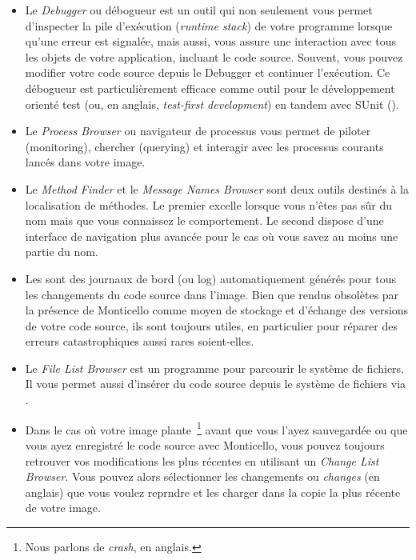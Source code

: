 \documentclass[a4paper,10pt,twoside]{book}
\begin{document}
\begin{itemize}
Vous pouvez m\^eme inspecter des outils en cliquant via le
 de la souris pour afficher leur \emph{halo}
et en s\'electionnant l'ic\^one
\emph{debug}
\debugHandle .
  \item Le \emph{Debugger} ou d\'ebogueur est un outil qui non seulement vous permet
d'inspecter la pile d'ex\'ecution (\emph{runtime stack}) de votre
programme lorsque qu'une erreur est signal\'ee, mais aussi, 
vous assure une interaction avec tous les objets de votre application,
incluant le code source. Souvent, vous pouvez modifier votre 
code source depuis le Debugger et continuer l'ex\'ecution.
Ce d\'ebogueur est particuli\`erement efficace comme outil pour
le d\'eveloppement orient\'e test (ou, en anglais, \emph{test-first development}) en tandem
avec 
SUnit ().
  \item Le \emph{Process Browser} ou navigateur de processus vous permet de piloter (monitoring), chercher (querying) et interagir avec les processus courants lanc\'es dans votre image.
  \item Le \emph{Method Finder} et le \emph{Message Names Browser} sont 
deux outils destin\'es \`a la localisation de m\'ethodes. Le
premier excelle lorsque vous n'\^etes pas s\^ur du nom mais que vous
connaissez le comportement.
Le second dispose d'une interface de navigation plus avanc\'ee pour le cas o\`u
vous savez au moins une partie du nom.
  \item Les \changesets sont des journaux de bord (ou log) automatiquement g\'en\'er\'es pour tous les changements du code source dans l'image.
Bien que rendus obsol\`etes par la pr\'esence de Monticello comme
moyen de stockage et d'\'echange des versions de votre code source,
ils sont toujours utiles, en particulier pour r\'eparer des erreurs
catastrophiques aussi rares soient-elles.
  \item Le \emph{File List Browser} est un programme pour parcourir le
syst\`eme de fichiers. Il vous permet aussi d'ins\'erer du code
source depuis le syst\`eme de fichiers via .
  \item Dans le cas o\`u votre image plante~\footnote{Nous parlons de \emph{crash}, en anglais.} avant que
vous l'ayez sauvegard\'ee ou que vous ayez enregistr\'e le code source
avec Monticello, vous pouvez toujours retrouver vos modifications les
plus r\'ecentes en utilisant un \emph{Change List Browser}. 
Vous pouvez alors s\'electionner les changements ou \emph{changes} (en anglais) que vous voulez reprndre et les charger dans la copie la plus r\'ecente de votre image.
\end{itemize}

\ifx\wholebook\relax\else
\end{document}
